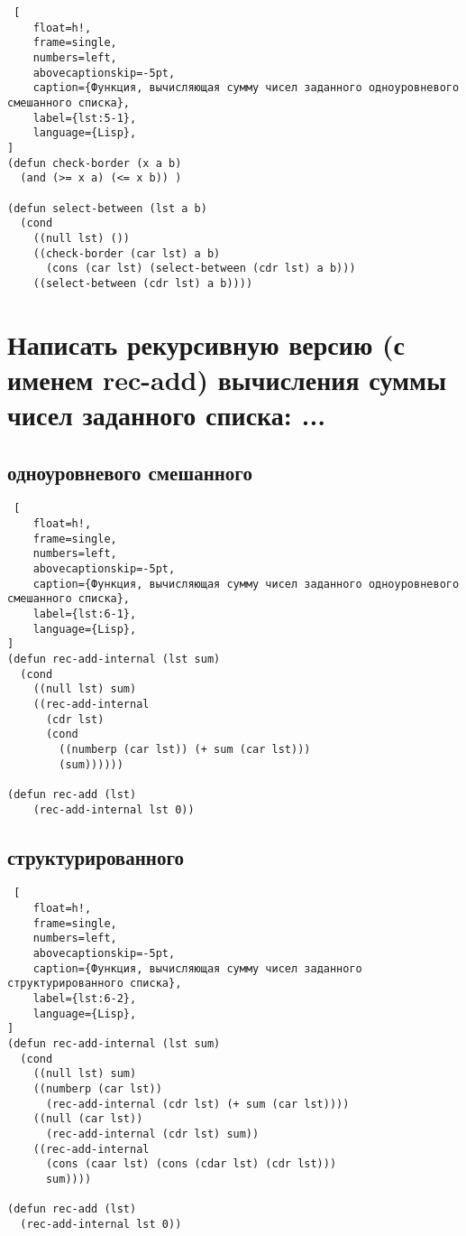 \begin{lstlisting} [
	float=h!,
	frame=single,
	numbers=left,
	abovecaptionskip=-5pt,
	caption={Функция, вычисляющая сумму чисел заданного одноуровневого смешанного списка},
	label={lst:5-1},
	language={Lisp},
]
(defun check-border (x a b)
  (and (>= x a) (<= x b)) )

(defun select-between (lst a b)
  (cond
    ((null lst) ())
    ((check-border (car lst) a b)
      (cons (car lst) (select-between (cdr lst) a b)))
    ((select-between (cdr lst) a b))))
\end{lstlisting}

\section{Написать рекурсивную версию (с именем rec-add) вычисления суммы чисел заданного списка: ...}

\subsection{одноуровневого смешанного}

\begin{lstlisting} [
	float=h!,
	frame=single,
	numbers=left,
	abovecaptionskip=-5pt,
	caption={Функция, вычисляющая сумму чисел заданного одноуровневого смешанного списка},
	label={lst:6-1},
	language={Lisp},
]
(defun rec-add-internal (lst sum)
  (cond
    ((null lst) sum)
    ((rec-add-internal
      (cdr lst)
      (cond
        ((numberp (car lst)) (+ sum (car lst)))
        (sum))))))

(defun rec-add (lst)
	(rec-add-internal lst 0))
\end{lstlisting}

\subsection{структурированного}

\begin{lstlisting} [
	float=h!,
	frame=single,
	numbers=left,
	abovecaptionskip=-5pt,
	caption={Функция, вычисляющая сумму чисел заданного структурированного списка},
	label={lst:6-2},
	language={Lisp},
]
(defun rec-add-internal (lst sum)
  (cond
    ((null lst) sum)
    ((numberp (car lst))
      (rec-add-internal (cdr lst) (+ sum (car lst))))
    ((null (car lst))
      (rec-add-internal (cdr lst) sum))
    ((rec-add-internal
      (cons (caar lst) (cons (cdar lst) (cdr lst)))
      sum))))

(defun rec-add (lst)
  (rec-add-internal lst 0))
\end{lstlisting}

